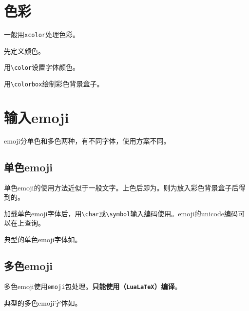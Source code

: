 \documentclass[10pt,openany]{book}
\begin{document}
\begin{sloppypar}
    

    \section{色彩}

    一般用\texttt{xcolor}处理色彩。

    先定义颜色。

    

    用\texttt{\textbackslash{}color}设置字体颜色。

    

    用\texttt{\textbackslash{}colorbox}绘制彩色背景盒子。

    

    \section{输入emoji}

    emoji分单色和多色两种，有不同字体，使用方案不同。

    \subsection{单色emoji}

    单色emoji的使用方法近似于一般文字。上色后{\color{pink}即为}。{\checkmark}则为放入彩色背景盒子后得到的。

    加载单色emoji字体后，用\texttt{\textbackslash{}char}或\texttt{\textbackslash{}symbol}输入编码使用。emoji的unicode编码可以在上查询。

    典型的单色emoji字体如。

    

    \subsection{多色emoji}

    多色emoji使用\texttt{emoji}包处理。\textbf{只能使用\LuaLaTeX（\texttt{LuaLaTeX}）编译}。

    典型的多色emoji字体如。


\end{sloppypar}
\end{document}
